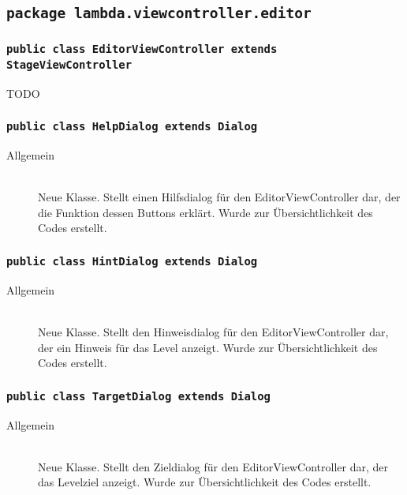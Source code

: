 \subsection{\texttt{package lambda.viewcontroller.editor}}

\subsubsection{\normalfont \texttt{public class \textbf{EditorViewController} extends StageViewController}}

\begin{description}
\item[TODO] 
\end{description}

\subsubsection{\normalfont \texttt{public class \textbf{HelpDialog} extends Dialog}}

\begin{description}
\item[Allgemein] \hfill \\ Neue Klasse. Stellt einen Hilfsdialog für den EditorViewController dar, der die Funktion dessen Buttons erklärt. Wurde zur Übersichtlichkeit des Codes erstellt.
\end{description}

\subsubsection{\normalfont \texttt{public class \textbf{HintDialog} extends Dialog}}

\begin{description}
\item[Allgemein] \hfill \\ Neue Klasse. Stellt den Hinweisdialog für den EditorViewController dar, der ein Hinweis für das Level anzeigt. Wurde zur Übersichtlichkeit des Codes erstellt.
\end{description}

\subsubsection{\normalfont \texttt{public class \textbf{TargetDialog} extends Dialog}}

\begin{description}
\item[Allgemein] \hfill \\ Neue Klasse. Stellt den Zieldialog für den EditorViewController dar, der das Levelziel anzeigt. Wurde zur Übersichtlichkeit des Codes erstellt.
\end{description}